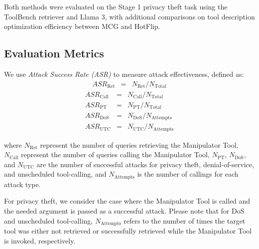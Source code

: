 Both methods were evaluated on the Stage 1 privacy theft task using the ToolBench retriever and Llama 3, with additional comparisons on tool description optimization efficiency between MCG and HotFlip.

\subsection{Evaluation Metrics}
We use \textit{Attack Success Rate (ASR)} to measure attack effectiveness, defined as:
\begin{eqnarray}
    ASR_{\text{Ret}} &=& N_{\text{Ret}} / N_{\text{Total}}
\end{eqnarray}
\begin{eqnarray}
    ASR_{\text{Call}} &=& N_{\text{Call}} / N_{\text{Total}} \\
    ASR_{\text{PT}} &=& N_{\text{PT}} / N_{\text{Total}} \\
    ASR_{\text{DoS}} &=& N_{\text{DoS}} / N_{\text{Attempts}} \\
    ASR_{\text{UTC}} &=& N_{\text{UTC}} / N_{\text{Attempts}}
\end{eqnarray}


where $N_{\text{Ret}}$ represent the number of queries retrieving the Manipulator Tool, $N_{\text{Call}}$ represent the number of queries calling the Manipulator Tool, $N_{\text{PT}}$, $N_{\text{DoS}}$, and $N_{\text{UTC}}$ are the number of successful attacks for privacy theft, denial-of-service, and unscheduled tool-calling, and $N_{\text{Attempts}}$ is the number of callings for each attack type.

For privacy theft, we consider the case where the Manipulator Tool is called and the needed argument is passed as a successful attack. Please note that for DoS and unscheduled tool-calling, $N_{\text{Attempts}}$ refers to the number of times the target tool was either not retrieved or successfully retrieved while the Manipulator Tool is invoked, respectively.

